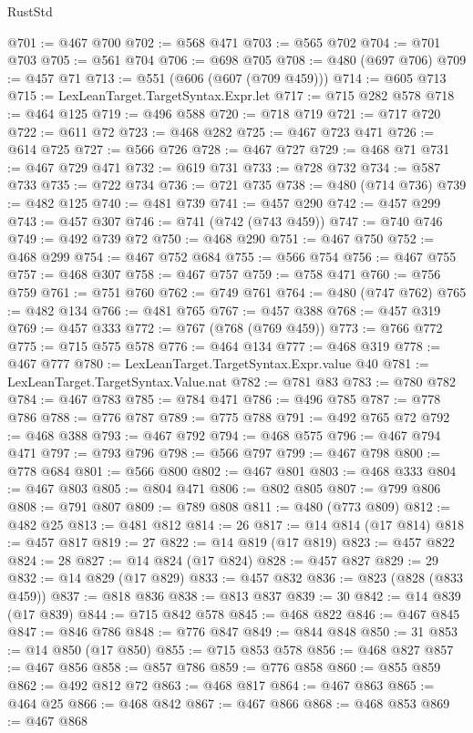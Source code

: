 \begin{lexlean}{RustStd}
\begin{coremodule}
@701 := @467 @700
@702 := @568 @471
@703 := @565 @702
@704 := @701 @703
@705 := @561 @704
@706 := @698 @705
@708 := @480 (@697 @706)
@709 := @457 @71
@713 := @551 (@606 (@607 (@709 @459)))
@714 := @605 @713
@715 := LexLeanTarget.TargetSyntax.Expr.let
@717 := @715 @282 @578
@718 := @464 @125
@719 := @496 @588
@720 := @718 @719
@721 := @717 @720
@722 := @611 @72
@723 := @468 @282
@725 := @467 @723 @471
@726 := @614 @725
@727 := @566 @726
@728 := @467 @727
@729 := @468 @71
@731 := @467 @729 @471
@732 := @619 @731
@733 := @728 @732
@734 := @587 @733
@735 := @722 @734
@736 := @721 @735
@738 := @480 (@714 @736)
@739 := @482 @125
@740 := @481 @739
@741 := @457 @290
@742 := @457 @299
@743 := @457 @307
@746 := @741 (@742 (@743 @459))
@747 := @740 @746
@749 := @492 @739 @72
@750 := @468 @290
@751 := @467 @750
@752 := @468 @299
@754 := @467 @752 @684
@755 := @566 @754
@756 := @467 @755
@757 := @468 @307
@758 := @467 @757
@759 := @758 @471
@760 := @756 @759
@761 := @751 @760
@762 := @749 @761
@764 := @480 (@747 @762)
@765 := @482 @134
@766 := @481 @765
@767 := @457 @388
@768 := @457 @319
@769 := @457 @333
@772 := @767 (@768 (@769 @459))
@773 := @766 @772
@775 := @715 @575 @578
@776 := @464 @134
@777 := @468 @319
@778 := @467 @777
@780 := LexLeanTarget.TargetSyntax.Expr.value @40
@781 := LexLeanTarget.TargetSyntax.Value.nat
@782 := @781 @83
@783 := @780 @782
@784 := @467 @783
@785 := @784 @471
@786 := @496 @785
@787 := @778 @786
@788 := @776 @787
@789 := @775 @788
@791 := @492 @765 @72
@792 := @468 @388
@793 := @467 @792
@794 := @468 @575
@796 := @467 @794 @471
@797 := @793 @796
@798 := @566 @797
@799 := @467 @798
@800 := @778 @684
@801 := @566 @800
@802 := @467 @801
@803 := @468 @333
@804 := @467 @803
@805 := @804 @471
@806 := @802 @805
@807 := @799 @806
@808 := @791 @807
@809 := @789 @808
@811 := @480 (@773 @809)
@812 := @482 @25
@813 := @481 @812
@814 := 26
@817 := @14 @814 (@17 @814)
@818 := @457 @817
@819 := 27
@822 := @14 @819 (@17 @819)
@823 := @457 @822
@824 := 28
@827 := @14 @824 (@17 @824)
@828 := @457 @827
@829 := 29
@832 := @14 @829 (@17 @829)
@833 := @457 @832
@836 := @823 (@828 (@833 @459))
@837 := @818 @836
@838 := @813 @837
@839 := 30
@842 := @14 @839 (@17 @839)
@844 := @715 @842 @578
@845 := @468 @822
@846 := @467 @845
@847 := @846 @786
@848 := @776 @847
@849 := @844 @848
@850 := 31
@853 := @14 @850 (@17 @850)
@855 := @715 @853 @578
@856 := @468 @827
@857 := @467 @856
@858 := @857 @786
@859 := @776 @858
@860 := @855 @859
@862 := @492 @812 @72
@863 := @468 @817
@864 := @467 @863
@865 := @464 @25
@866 := @468 @842
@867 := @467 @866
@868 := @468 @853
@869 := @467 @868

\end{coremodule}
\end{lexlean}
